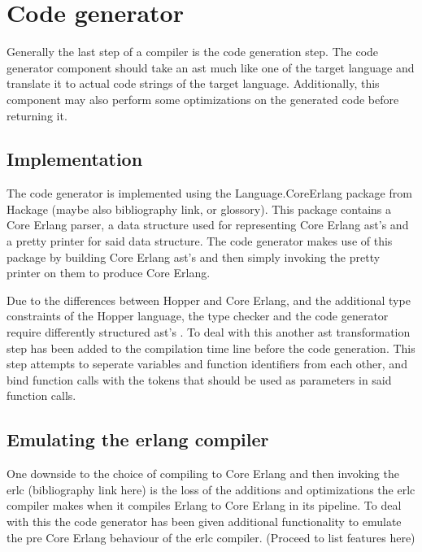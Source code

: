 \section{Code generator}

Generally the last step of a compiler is the code generation step. The code generator
component should take an \gls{ast} much like one of the target language and translate it
to actual code strings of the target language. Additionally, this component may also
perform some optimizations on the generated code before returning it.

\subsection{Implementation}

The code generator is implemented using the Language.CoreErlang \cite{CoreErlang} package
from Hackage (maybe also bibliography link, or glossory). This package contains a Core Erlang
parser, a data structure used for representing Core Erlang \gls{ast}'s and a pretty printer for
said data structure. The code generator makes use of this package by building Core Erlang
\gls{ast}'s and then simply invoking the pretty printer on them to  produce Core Erlang.

Due to the differences between Hopper and Core Erlang, and the additional type constraints
of the Hopper language, the type checker and the code generator require differently
structured \gls{ast}'s . To deal with this another \gls{ast} transformation step has been added
to the compilation time line before the code generation. This step attempts to seperate variables
and function identifiers from each other, and bind function calls with the tokens that
should be used as parameters in said function calls.



\subsection{Emulating the erlang compiler}

One downside to the choice of compiling to Core Erlang and then invoking the erlc
(bibliography link here) is the loss of the additions and optimizations the erlc
compiler makes when it compiles Erlang to Core Erlang in its pipeline. To deal with this
the code generator has been given additional functionality to emulate the pre Core Erlang
behaviour of the erlc compiler. (Proceed to list features here)